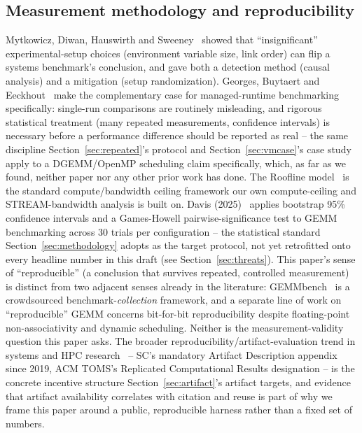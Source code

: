 \documentclass[acmsmall]{acmart}
\begin{document}
\subsection{Measurement methodology and reproducibility}
Mytkowicz, Diwan, Hauswirth and Sweeney~\cite{mytkowicz2009producing}
showed that ``insignificant'' experimental-setup choices (environment
variable size, link order) can flip a systems benchmark's conclusion,
and gave both a detection method (causal analysis) and a mitigation
(setup randomization). Georges, Buytaert and
Eeckhout~\cite{georges2007statistically} make the complementary case
for managed-runtime benchmarking specifically: single-run comparisons
are routinely misleading, and rigorous statistical treatment (many
repeated measurements, confidence intervals) is necessary before a
performance difference should be reported as real -- the same
discipline Section~\ref{sec:repeated}'s protocol and
Section~\ref{sec:vmcase}'s case study apply to a DGEMM/OpenMP
scheduling claim specifically, which, as far as we found, neither paper
nor any other prior work has done. The Roofline
model~\cite{williams2009roofline} is the standard compute/bandwidth
ceiling framework our own compute-ceiling and STREAM-bandwidth analysis
is built on. Davis (2025)~\cite{davis2025hpmm} applies bootstrap 95\%
confidence intervals and a Games-Howell pairwise-significance test to
GEMM benchmarking across 30 trials per configuration -- the statistical
standard Section~\ref{sec:methodology} adopts as the target protocol,
not yet retrofitted onto every headline number in this draft (see
Section~\ref{sec:threats}). This paper's sense of ``reproducible'' (a
conclusion that survives repeated, controlled measurement) is distinct
from two adjacent senses already in the literature: GEMMbench~\cite{gemmbench2015}
is a crowdsourced benchmark-\emph{collection} framework, and a separate
line of work on ``reproducible'' GEMM concerns bit-for-bit
reproducibility despite floating-point non-associativity and dynamic
scheduling. Neither is the measurement-validity question this paper
asks. The broader reproducibility/artifact-evaluation trend
in systems and HPC research~\cite{repro2025hpc,artifacts2022citations,toms2015rcr}
-- SC's mandatory Artifact Description appendix since 2019, ACM TOMS's
Replicated Computational Results designation -- is the concrete
incentive structure Section~\ref{sec:artifact}'s artifact targets, and
evidence that artifact availability correlates with citation and reuse
is part of why we frame this paper around a public, reproducible
harness rather than a fixed set of numbers.
\end{document}
